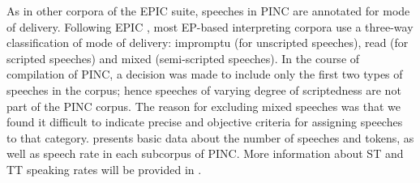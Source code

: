 \documentclass[output=paper]{langscibook}
\begin{document}
\begin{sloppypar}
As in other corpora of the EPIC suite, speeches in PINC are annotated for mode of delivery. Following EPIC \citep{MontiEtAl2005}, most EP-based interpreting corpora use a three-way classification of mode of delivery: impromptu (for unscripted speeches), read (for scripted speeches) and mixed (semi-scripted speeches). In the course of compilation of PINC, a decision was made to include only the first two types of speeches in the corpus; hence speeches of varying degree of scriptedness are not part of the PINC corpus. The reason for excluding mixed speeches was that we found it difficult to indicate precise and objective criteria for assigning speeches to that category.  presents basic data about the number of speeches and tokens, as well as speech rate in each subcorpus of PINC. More information about ST and TT speaking rates will be provided in .
\end{sloppypar}

\end{document}
